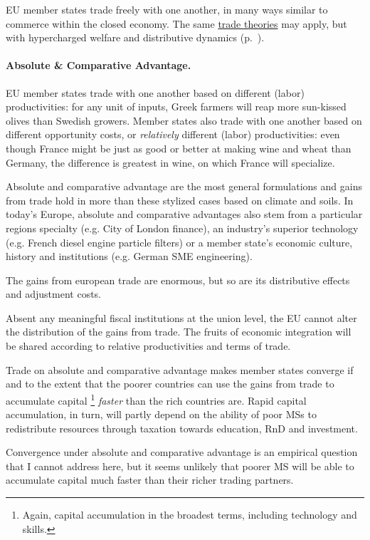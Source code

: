 \documentclass[11pt,a4paper,oneside]{article}
\begin{document}
\gls{EU} member states trade freely with one another, in many ways similar to commerce within the closed economy. 
The same \hyperref[sec:space]{trade theories} may apply, but with hypercharged welfare and distributive dynamics (p.~\pageref{sec:space}). 
		
\paragraph{Absolute \& Comparative Advantage.} 
\gls{EU} member states trade with one another based on different (labor) productivities: 
for any unit of inputs, Greek farmers will reap more sun-kissed olives than Swedish growers. 
Member states also trade with one another based on different opportunity costs, or \emph{relatively} different (labor) productivities: 
even though France might be just as good or better at making wine and wheat than Germany, the difference is greatest in wine, on which France will specialize. 

Absolute and comparative advantage are the most general formulations and gains from trade hold in more than these stylized cases based on climate and soils. 
In today's Europe, absolute and comparative advantages also stem from a particular regions specialty (e.g. City of London finance), an industry's superior technology (e.g. French diesel engine particle filters) or a member state's economic culture, history and institutions (e.g. German \gls{SME} engineering).

The gains from european trade are enormous, but so are its distributive effects and adjustment costs. 

Absent any meaningful fiscal institutions at the union level, the \gls{EU} cannot alter the distribution of the gains from trade. 
The fruits of economic integration will be shared according to relative productivities and terms of trade.

Trade on absolute and comparative advantage makes member states converge if and to the extent that the poorer countries can use the gains from trade to accumulate capital\ignorespaces
 \footnote{
		Again, capital accumulation in the broadest terms, including technology and skills.
	}
\emph{faster} than the rich countries are. 
Rapid capital accumulation, in turn, will partly depend on the ability of poor \glspl{MS} to redistribute resources through taxation towards education, \gls{RnD} and investment.

Convergence under absolute and comparative advantage is an empirical question that I cannot address here, but it seems unlikely that poorer \gls{MS} will be able to accumulate capital much faster than their richer trading partners. 
\end{document}
